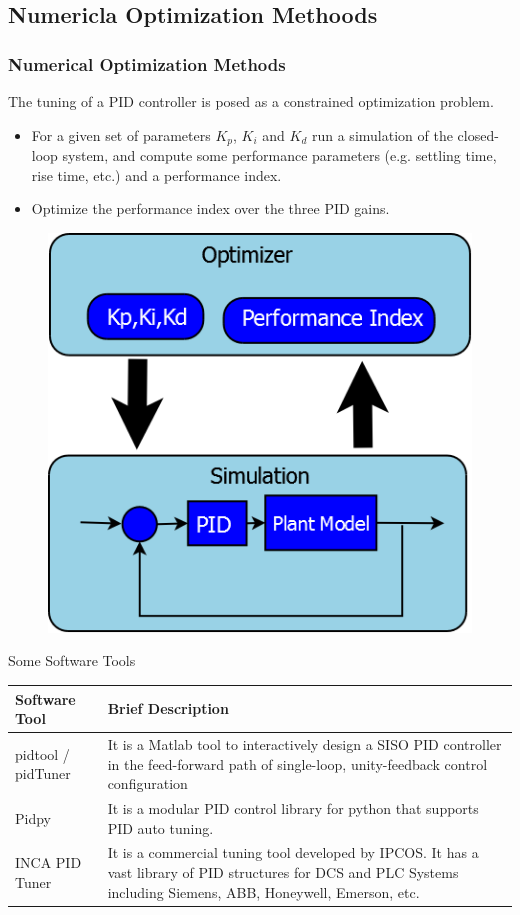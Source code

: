 \subsection{Numericla Optimization Methoods}

\begin{frame}
	\small{
	\frametitle{Numerical Optimization Methods}
	The tuning of a PID controller is posed as a constrained optimization problem.  
	\begin{itemize}
			\item For a given set of parameters $K_p$, $K_i$ and $K_d$ run a simulation of the closed-loop system, and compute some performance parameters (e.g. settling time, rise time, etc.) and a performance index.
			\item Optimize the performance index over the three PID gains.
	\end{itemize}}
	\begin{figure}
	\includegraphics[width=0.3\linewidth]{img/PID_1}
	\end{figure}	
\end{frame}

\begin{frame}{Some Software Tools}
	\small{
	\begin{tabular}{|p{3cm}|p{7cm}|}
		\hline Software Tool  & Brief Description  \\ 
		\hline pidtool / pidTuner
		 & It is a Matlab tool to interactively design a SISO PID controller in the feed-forward path of single-loop, unity-feedback control configuration \\ 
		\hline Pidpy
		 & It is a modular PID control library for python that supports PID auto tuning. {\color{blue}{\url{https://pypi.python.org/pypi/pypid/}}}
		 \\ 
		\hline INCA PID Tuner
		 & It is a commercial tuning tool developed by IPCOS. It has a vast library of PID structures for DCS and PLC  Systems including Siemens, ABB, Honeywell, Emerson, etc.
		 {\color{blue}{\url{http://www.ipcos.com/advancedprocesscontrol/advanced-process-control/pid-tuning-software/inca-pid-tuning/}}}
		 \\ 
		\hline 
	\end{tabular}}
\end{frame}

